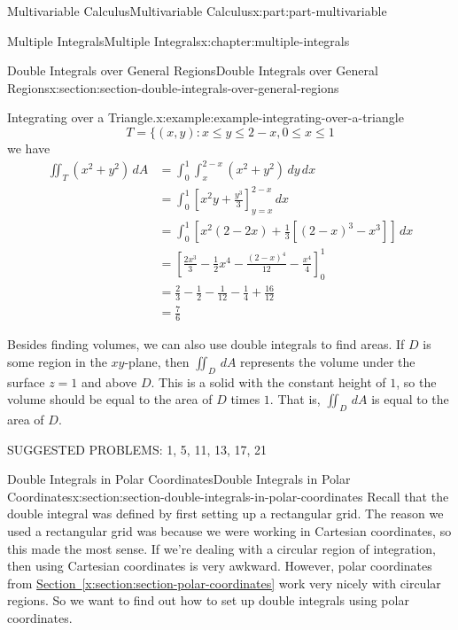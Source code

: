 \documentclass[twoside,10pt,]{book}
\newcommand{\xreffont}{\relax}
\numberwithin{equation}{part}
\begin{document}
\begin{partptx}{Multivariable Calculus}{}{Multivariable Calculus}{}{}{x:part:part-multivariable}
\begin{chapterptx}{Multiple Integrals}{}{Multiple Integrals}{}{}{x:chapter:multiple-integrals}
\begin{sectionptx}{Double Integrals over General Regions}{}{Double Integrals over General Regions}{}{}{x:section:section-double-integrals-over-general-regions}
\begin{example}{Integrating over a Triangle.}{x:example:example-integrating-over-a-triangle}
\begin{equation*}
T = \{(x,y) : x \leq y \leq 2-x, 0\leq x\leq 1
\end{equation*}
we have%
\begin{align*}
\iint_{T}(x^{2} + y^{2})\,dA & = \int_{0}^{1}\int_{x}^{2-x}(x^{2} + y^{2})\,dy\,dx \\
& = \int_{0}^{1}\left[x^{2}y + \frac{y^{3}}{3}\right]_{y=x}^{2-x}\,dx \\
& = \int_{0}^{1} \left[x^{2}(2-2x) + \frac{1}{3}[(2-x)^{3} - x^{3}]\right]\,dx \\
& = \left[\frac{2x^{3}}{3} - \frac{1}{2}x^{4} - \frac{(2-x)^{4}}{12} - \frac{x^{4}}{4}\right]_{0}^{1} \\
& = \frac{2}{3} - \frac{1}{2} - \frac{1}{12} - \frac{1}{4} + \frac{16}{12} \\
& = \frac{7}{6} 
\end{align*}
%
\end{example}
Besides finding volumes, we can also use double integrals to find areas. If \(D\) is some region in the \(xy\)-plane, then \(\iint_{D}\,dA\) represents the volume under the surface \(z=1\) and above \(D\). This is a solid with the constant height of \(1\), so the volume should be equal to the area of \(D\) times \(1\). That is, \(\iint_{D}\,dA\) is equal to the area of \(D\).%
\par
SUGGESTED PROBLEMS: 1, 5, 11, 13, 17, 21%
\end{sectionptx}
%
%
\typeout{************************************************}
\typeout{************************************************}
%
\begin{sectionptx}{Double Integrals in Polar Coordinates}{}{Double Integrals in Polar Coordinates}{}{}{x:section:section-double-integrals-in-polar-coordinates}
Recall that the double integral was defined by first setting up a rectangular grid. The reason we used a rectangular grid was because we were working in Cartesian coordinates, so this made the most sense. If we're dealing with a circular region of integration, then using Cartesian coordinates is very awkward. However, polar coordinates from \hyperref[x:section:section-polar-coordinates]{Section~{\xreffont\ref{x:section:section-polar-coordinates}}} work very nicely with circular regions. So we want to find out how to set up double integrals using polar coordinates.%
\par

\end{sectionptx}
\end{chapterptx}
\end{partptx}
\end{document}
